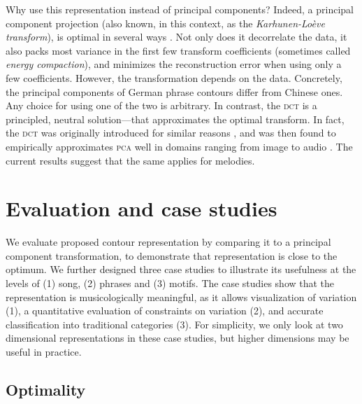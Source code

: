 \documentclass{article}
\begin{document}
Why use this representation instead of principal components?
Indeed, a principal component projection (also known, in this context, as the \emph{Karhunen-Loève transform}), is optimal in several ways \cite{Rao1990,Ahmed1974}.
Not only does it decorrelate the data, it also packs most variance in the first few transform coefficients (sometimes called \emph{energy compaction}), and minimizes the reconstruction error when using only a few coefficients.
However, the transformation depends on the data.
Concretely, the principal components of German phrase contours differ from Chinese ones. 
Any choice for using one of the two is arbitrary. 
In contrast,  the \textsc{dct} is a principled, neutral solution---that approximates the optimal transform.
In fact, the \textsc{dct} was originally introduced for similar reasons \cite{Ahmed1974}, and was then found to empirically approximates \textsc{pca} well in domains ranging from image to audio \cite{Rao1990}.
The current results suggest that the same applies for melodies.


\section{Evaluation and case studies}


We evaluate proposed contour representation by comparing it to a principal component transformation, to demonstrate that representation is close to the optimum. We further designed three case studies to illustrate its usefulness at the levels of (1) song, (2) phrases and (3) motifs.
The case studies show that the representation is musicologically meaningful, as it allows visualization of variation (1), a quantitative evaluation of constraints on variation (2), and accurate classification into traditional categories (3).
For simplicity, we only look at two dimensional representations in these case studies, but higher dimensions may be useful in practice.


\subsection{Optimality}
\end{document}

